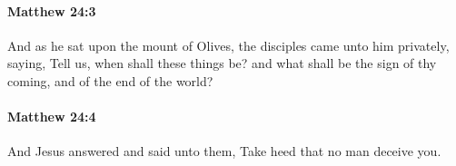 		\paragraph{Matthew 24:3} %
			\label{MATTHEW-24-3}

			And as he sat upon the mount of Olives, the disciples came unto him privately, saying, Tell us, when shall these things be? and what shall be the sign of thy coming, and of the end of the world?

			\begin{framed}
			\scriptsize
				\begin{compactdesc}
					\item[SBLG] 
				\end{compactdesc}
			\end{framed}

		\paragraph{Matthew 24:4} %
			\label{MATTHEW-24-4}

			And Jesus answered and said unto them, Take heed that no man deceive you.

